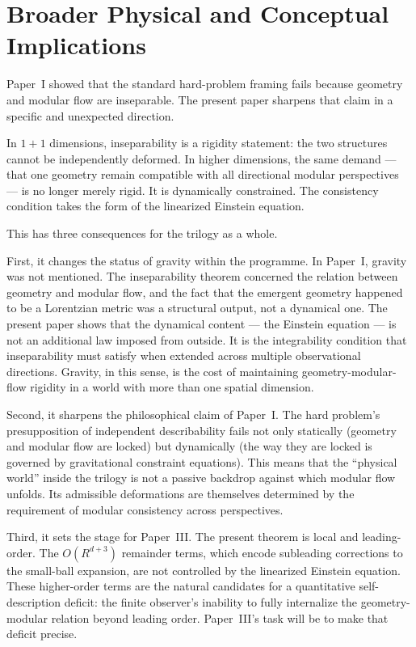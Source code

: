 \documentclass[12pt]{article}
\theoremstyle{definition}
\theoremstyle{remark}
\begin{document}
\section{Broader Physical and Conceptual Implications}\label{sec:7}

Paper~I\cite{PaperI} showed that the standard hard-problem framing fails because geometry and modular flow are inseparable. The present paper sharpens that claim in a specific and unexpected direction.

In \(1+1\) dimensions, inseparability is a rigidity statement: the two structures cannot be independently deformed. In higher dimensions, the same demand --- that one geometry remain compatible with all directional modular perspectives --- is no longer merely rigid. It is dynamically constrained. The consistency condition takes the form of the linearized Einstein equation.

This has three consequences for the trilogy as a whole.

First, it changes the status of gravity within the programme. In Paper~I\cite{PaperI}, gravity was not mentioned. The inseparability theorem concerned the relation between geometry and modular flow, and the fact that the emergent geometry happened to be a Lorentzian metric was a structural output, not a dynamical one. The present paper shows that the dynamical content --- the Einstein equation --- is not an additional law imposed from outside. It is the integrability condition that inseparability must satisfy when extended across multiple observational directions. Gravity, in this sense, is the cost of maintaining geometry-modular-flow rigidity in a world with more than one spatial dimension.

Second, it sharpens the philosophical claim of Paper~I\cite{PaperI}. The hard problem's presupposition of independent describability fails not only statically (geometry and modular flow are locked) but dynamically (the way they are locked is governed by gravitational constraint equations). This means that the ``physical world'' inside the trilogy is not a passive backdrop against which modular flow unfolds. Its admissible deformations are themselves determined by the requirement of modular consistency across perspectives.

Third, it sets the stage for Paper~III. The present theorem is local and leading-order. The \(O(R^{d+3})\) remainder terms, which encode subleading corrections to the small-ball expansion, are not controlled by the linearized Einstein equation. These higher-order terms are the natural candidates for a quantitative self-description deficit: the finite observer's inability to fully internalize the geometry-modular relation beyond leading order. Paper~III's task will be to make that deficit precise.
\end{document}
